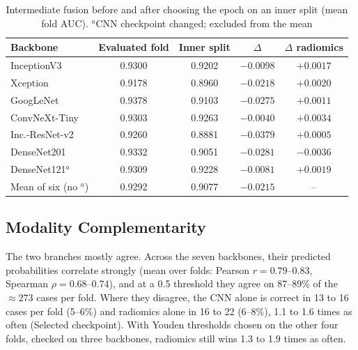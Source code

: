 \documentclass[conference]{IEEEtran}
\begin{document}
\begin{table}[t]
\caption{Intermediate fusion before and after choosing the epoch on an inner split (mean fold AUC). $^{a}$CNN checkpoint changed; excluded from the mean}
\label{tab:selection}
\centering
\footnotesize
\setlength{\tabcolsep}{3pt}
\begin{tabular}{@{}lcccc@{}}
\toprule
Backbone & Evaluated fold & Inner split & $\Delta$ & $\Delta$ radiomics \\
\midrule
InceptionV3 & 0.9300 & 0.9202 & $-0.0098$ & $+0.0017$ \\
Xception & 0.9178 & 0.8960 & $-0.0218$ & $+0.0020$ \\
GoogLeNet & 0.9378 & 0.9103 & $-0.0275$ & $+0.0011$ \\
ConvNeXt-Tiny & 0.9303 & 0.9263 & $-0.0040$ & $+0.0034$ \\
Inc.-ResNet-v2 & 0.9260 & 0.8881 & $-0.0379$ & $+0.0005$ \\
DenseNet201 & 0.9332 & 0.9051 & $-0.0281$ & $-0.0036$ \\
DenseNet121$^{a}$ & 0.9309 & 0.9228 & $-0.0081$ & $+0.0019$ \\
\midrule
Mean of six (no $^{a}$) & 0.9292 & 0.9077 & $-0.0215$ & -- \\
\bottomrule
\end{tabular}
\end{table}

\subsection{Modality Complementarity}\label{sec:complementarity}
The two branches mostly agree. Across the seven backbones, their predicted probabilities correlate strongly (mean over folds: Pearson $r=0.79$--0.83, Spearman $\rho=0.68$--0.74), and at a 0.5 threshold they agree on 87--89\% of the $\approx273$ cases per fold. Where they disagree, the CNN alone is correct in 13 to 16 cases per fold (5--6\%) and radiomics alone in 16 to 22 (6--8\%), 1.1 to 1.6 times as often (Selected checkpoint). With Youden thresholds chosen on the other four folds, checked on three backbones, radiomics still wins 1.3 to 1.9 times as often.
\end{document}

